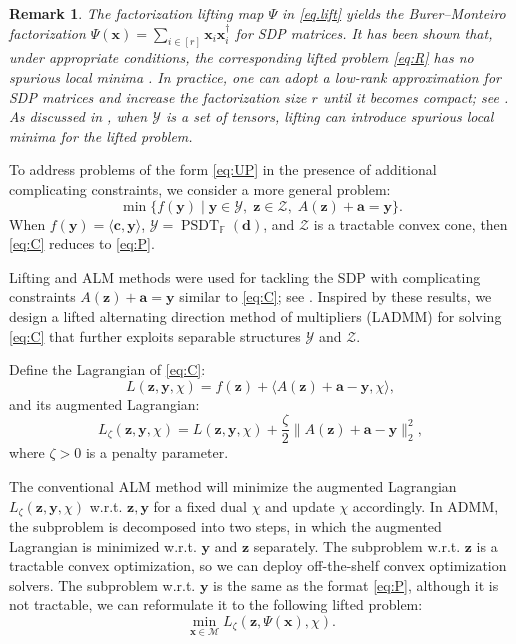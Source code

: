 \documentclass[smallextended]{svjour3}
\newtheorem{remark}{Remark}
\newcommand{\cY}{\mathcal Y}
\newcommand{\F}{\mathbb F}
\newcommand{\cZ}{\mathcal Z}
\newcommand{\cM}{\mathcal M}
\DeclareMathOperator{\SOST}{PSDT}
\newcommand{\1}{\mathbf{1}}
\newcommand{\x}{\mathbf{x}}
\newcommand{\y}{\mathbf{y}}
\newcommand{\z}{\mathbf{z}}
\newcommand{\bc}{\mathbf{c}}
\renewcommand{\a}{\mathbf{a}}
\newcommand{\inner}[2]{\langle #1, #2 \rangle}
\newcommand{\norm}[1]{\lVert#1\rVert}
\newcommand{\vc}[1]{\mathbf{#1}}
\newcommand{\vd}{\vc{d}}
\begin{document}
\begin{remark}
    \label{rmk.sdp}
    The factorization lifting map \(\Psi\) in \eqref{eq.lift} yields the Burer–Monteiro factorization \(\Psi(\x)=\sum_{i\in[r]}\x_i\x_i^\dagger\) for SDP matrices. It has been shown that, under appropriate conditions, the corresponding lifted problem \eqref{eq:R} has no spurious local minima \cite{burer2005local,journee2010low}. In practice, one can adopt a low-rank approximation for SDP matrices and increase the factorization size \(r\) until it becomes compact; see \cite{burer2003nonlinear,boumal2016non,journee2010low,tang2024feasible2,tang2024feasible}. As discussed in \cite{levin2025effect}, when \(\cY\) is a set of tensors, lifting can introduce spurious local minima for the lifted problem.
\end{remark}

To address problems of the form \eqref{eq:UP} in the presence of additional complicating constraints, we consider a more general problem:
\begin{equation}
    \label{eq:C} \tag{C}
     \min\{f(\y) \mid \y \in \cY,\; \z \in \cZ,\; A(\z) + \a = \y\}.
\end{equation}
When \(f(\y)=\langle\bc,\y\rangle\), \(\cY=\SOST_{\F}(\vd)\), and \(\cZ\) is a tractable convex cone, then \eqref{eq:C} reduces to \eqref{eq:P}.



 Lifting and ALM methods were used for tackling the SDP with complicating constraints $A(\z) + \a = \y$  similar to \eqref{eq:C}; see
\cite{wang2023decomposition,wang2025solving,tang2024feasible}. Inspired by these results,
 we  design a lifted alternating direction method of
multipliers (LADMM) for solving \eqref{eq:C} that further exploits separable structures $\cY$ and $\cZ$.


Define the Lagrangian of \eqref{eq:C}:
 \begin{equation}
    \label{eq.L} \tag{L}
    L(\z,\y,\chi) = f(\z) + \inner{A(\z) +  \a - \y}{\chi},
 \end{equation}
and  its augmented Lagrangian:
 \begin{equation}
    \label{eq.AL} \tag{AL}
    L_\zeta(\z,\y,\chi) = L(\z,\y,\chi) + \frac{\zeta}{2}\norm{A(\z) +  \a - \y}_2^2,
 \end{equation}
where $\zeta > 0$ is a penalty parameter.

The conventional ALM method will minimize the augmented Lagrangian $ L_{\zeta}(\z,\y,\chi) $ w.r.t. $\z,\y$ for a fixed dual $\chi$ and update $\chi$ accordingly.  In ADMM, the subproblem is decomposed into two steps, in which the augmented Lagrangian is minimized w.r.t. $\y$ and $\z$ separately. The subproblem w.r.t. $\z$ is a tractable convex optimization, so we can deploy off-the-shelf convex optimization solvers. The subproblem w.r.t. $\y$ is the same as the format \eqref{eq:P}, although it is not tractable, we can reformulate it  to the following lifted problem:
\begin{equation}
    \label{eq.single}
     \min_{\x \in \cM}L_{\zeta}(\z,\Psi(\x), \chi).
\end{equation}
\end{document}
